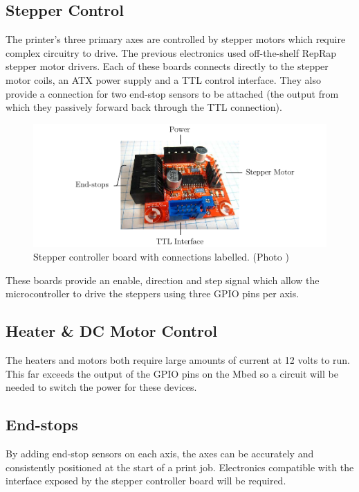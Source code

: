 		\subsection{Stepper Control}
			
			
			The printer's three primary axes are controlled by stepper motors which require
			complex circuitry to drive. The previous electronics used off-the-shelf RepRap
			stepper motor drivers\cite{stepperMotorDriver23}. Each of these boards
			connects directly to the stepper motor coils, an ATX power supply and a
			TTL control interface. They also provide a connection for two end-stop
			sensors to be attached (the output from which they passively forward back
			through the TTL connection).
			
			\begin{figure}[here]
				\includegraphics[width=1\textwidth]{diagrams/stepperControllerBoard.pdf}
				\caption{Stepper controller board with connections labelled. (Photo \cite{stepperControllerBoardPhoto})}
				\label{fig:stepperControllerBoard}
			\end{figure}
			
			These boards provide an enable, direction and step signal which allow
			the microcontroller to drive the steppers using three GPIO pins per axis.
		
		\subsection{Heater \& DC Motor Control}
			
			The heaters and motors both require large amounts of current at 12 volts
			to run. This far exceeds the output of the GPIO pins on the Mbed so a
			circuit will be needed to switch the power for these devices.
			
		
		\subsection{End-stops}
			
			By adding end-stop sensors on each axis, the axes can be accurately and
			consistently positioned at the start of a print job. Electronics
			compatible with the interface exposed by the stepper controller board will
			be required.
			
			
